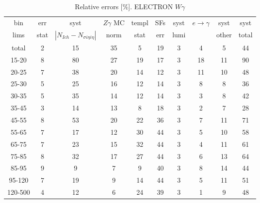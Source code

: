 \begin{table}[h]
  \scriptsize
  \begin{center}
  \caption{Relative errors [\%]. ELECTRON $W\gamma$}
   \begin{tabular}{|c|c|c|c|c|c|c|c|c|c|}
    bin  & err & syst & $Z\gamma$ MC & templ & SFs & syst & $e\rightarrow\gamma$ & syst & syst\\
    lims  & stat & $|N_{Ich}-N_{\sigma{i\eta i\eta}}|$ & norm & stat & err & lumi &  & other & total\\ \hline
    total  & 2 & 15 & 35 & 5 & 19 & 3 & 4 & 5 & 44 \\ \hline
    15-20 & 8 & 80 & 27 & 19 & 17 & 3 & 18 & 11 & 90 \\ \hline
    20-25 & 7 & 38 & 20 & 14 & 12 & 3 & 11 & 10 & 48 \\ \hline
    25-30 & 5 & 25 & 16 & 12 & 14 & 3 & 8 & 8 & 36 \\ \hline
    30-35 & 5 & 35 & 14 & 12 & 14 & 3 & 3 & 8 & 42 \\ \hline
    35-45 & 3 & 14 & 13 & 8 & 18 & 3 & 2 & 7 & 28 \\ \hline
    45-55 & 8 & 53 & 20 & 22 & 36 & 3 & 7 & 11 & 71 \\ \hline
    55-65 & 7 & 17 & 12 & 30 & 44 & 3 & 5 & 10 & 58 \\ \hline
    65-75 & 7 & 23 & 15 & 32 & 44 & 3 & 4 & 11 & 61 \\ \hline
    75-85 & 8 & 32 & 17 & 27 & 44 & 3 & 6 & 13 & 64 \\ \hline
    85-95 & 9 & 9 & 7 & 9 & 40 & 3 & 8 & 14 & 44 \\ \hline
    95-120 & 7 & 19 & 9 & 14 & 44 & 3 & 5 & 11 & 51 \\ \hline
    120-500 & 4 & 12 & 6 & 24 & 39 & 3 & 1 & 9 & 48 \\ \hline
  \end{tabular}
  \label{tab:systInPercent_ELECTRON_WGamma}
  \end{center}
\end{table}


